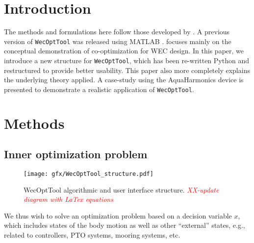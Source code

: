\documentclass[]{article}
\newcommand{\todo}[1]{\textcolor{red}{\emph{#1}}}
\begin{document}
\author[1]{Author}


\maketitle


\section{Introduction}\label{sec:intro}

The methods and formulations here follow those developed by \citet{Bacelli2014}.
A previous version of \texttt{WecOptTool} was released using MATLAB \cite{Coe2020b}.
\citet{Coe2020b} focuses mainly on the conceptual demonstration of co-optimization for WEC design.
In this paper, we introduce a new structure for \texttt{WecOptTool}, which has been re-written Python and restructured to provide better usability.
This paper also more completely explains the underlying theory applied.
A case-study using the AquaHarmonics device is presented to demonstrate a realistic application of \texttt{WecOptTool}.

\section{Methods}\label{sec:methods}

\subsection{Inner optimization problem}\label{sec:inner_optimization_problem}

\begin{figure*}[tb]
	\centering
	\texttt{[image: gfx/WecOptTool\_structure.pdf]}
	\caption{WecOptTool algorithmic and user interface structure. \todo{XX-update diagram with LaTex equations}}
	\label{fig:WecOptTool_structure}
\end{figure*}

We thus wish to solve an optimization problem based on a decision variable $x$, which includes states of the body motion as well as other ``external'' states, e.g., related to controllers, PTO systems, mooring systems, etc.
\end{document}
